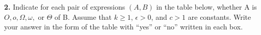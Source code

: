\documentclass[addpoints]{exam}
\begin{document}
\begin{questions}
\begin{solution}







  \end{solution}

  \question
  \textbf{2. } Indicate for each pair of expressions $(A, B)$ in the table below, whether A is $ O, o, \Omega, \omega,  $ or $ \Theta $ of B. Assume that $ k \geq 1 $, $ \epsilon > 0 $, and $ c > 1 $ are constants. Write your answer in the form of the table with ``yes'' or ``no'' written in each box.


\end{questions}
\end{document}
